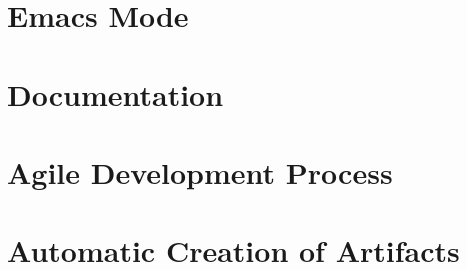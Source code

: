 \documentclass{article}
\begin{document}
\section{Emacs Mode}







\section{Documentation}




\section{Agile Development Process}



\section{Automatic Creation of Artifacts}


\end{document}
